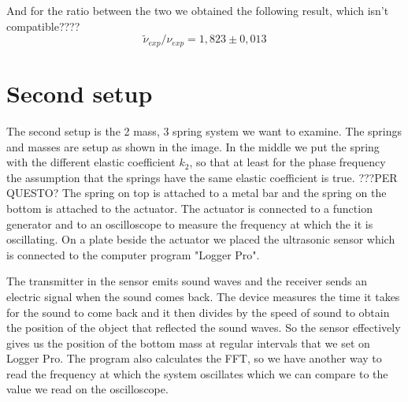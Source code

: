 \documentclass{article}
\begin{document}
And for the ratio between the two we obtained the following result, which isn't compatible????
\begin{equation}
    \tilde \nu_{exp} / \nu_{exp} = 1,823 \pm 0,013
\end{equation}


\section{Second setup} \label{sec:setup2}
The second setup is the 2 mass, 3 spring system we want to examine. The springs and masses are setup as shown in the image. 
In the middle we put the spring with the different elastic coefficient $k_2$, so that at least for the phase frequency the assumption that the springs have the same elastic coefficient is true. ???PER QUESTO?
The spring on top is attached to a metal bar and the spring on the bottom is attached to the actuator. The actuator is connected to a function generator and to an oscilloscope to measure the frequency at which the it is oscillating. On a plate beside the actuator we placed the ultrasonic sensor which is connected to the computer program "Logger Pro". 

The transmitter in the sensor emits sound waves and the receiver sends an electric signal when the sound comes back. The device measures the time it takes for the sound to come back and it then divides by the speed of sound to obtain the position of the object that reflected the sound waves. So the sensor effectively gives us the position of the bottom mass at regular intervals that we set on Logger Pro. The program also calculates the FFT, so we have another way to read the frequency at which the system oscillates which we can compare to the value we read on the oscilloscope. 


\end{document}
